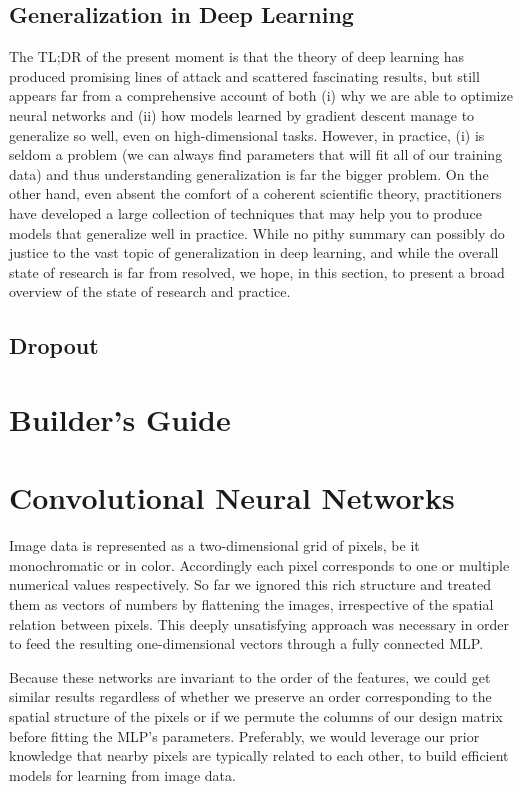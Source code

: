 \documentclass[a4paper,12pt]{article}
\theoremstyle{definition}
\begin{document}
    \subsection*{Generalization in Deep Learning}
    The TL;DR of the present moment is that the theory of deep learning has produced promising lines of attack and scattered fascinating results, but still appears far 
    from a comprehensive account of both (i) why we are able to optimize neural networks and (ii) how models learned by gradient descent manage to generalize so well, 
    even on high-dimensional tasks. However, in practice, (i) is seldom a problem (we can always find parameters that will fit all of our training data) and thus understanding 
    generalization is far the bigger problem. On the other hand, even absent the comfort of a coherent scientific theory, practitioners have developed a large collection 
    of techniques that may help you to produce models that generalize well in practice. While no pithy summary can possibly do justice to the vast topic of generalization 
    in deep learning, and while the overall state of research is far from resolved, we hope, in this section, to present a broad overview of the state of research and practice.
    
    \subsection*{Dropout}
    
    \section{Builder's Guide}

    \section{Convolutional Neural Networks}
    Image data is represented as a two-dimensional grid of pixels, be it monochromatic or in color. Accordingly each pixel corresponds to one or multiple numerical values
    respectively. So far we ignored this rich structure and treated them as vectors of numbers by flattening the images, irrespective of the spatial relation between pixels.
    This deeply unsatisfying approach was necessary in order to feed the resulting one-dimensional vectors through a fully connected MLP.

    Because these networks are invariant to the order of the features, we could get similar results regardless of whether we preserve an order corresponding to the spatial 
    structure of the pixels or if we permute the columns of our design matrix before fitting the MLP’s parameters. Preferably, we would leverage our prior knowledge that 
    nearby pixels are typically related to each other, to build efficient models for learning from image data.
\end{document}
